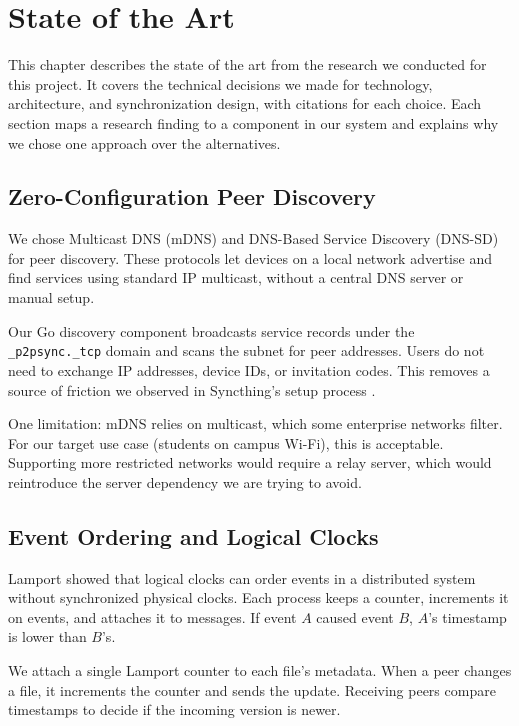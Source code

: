 \chapter{State of the Art}

This chapter describes the state of the art from the research we conducted for this project. It covers the technical decisions we made for technology, architecture, and synchronization design, with citations for each choice. Each section maps a research finding to a component in our system and explains why we chose one approach over the alternatives.

\section{Zero-Configuration Peer Discovery}

We chose Multicast DNS (mDNS) and DNS-Based Service Discovery (DNS-SD) \cite{rfc6762, rfc6763} for peer discovery. These protocols let devices on a local network advertise and find services using standard IP multicast, without a central DNS server or manual setup.

Our Go discovery component broadcasts service records under the \texttt{\_p2psync.\_tcp} domain and scans the subnet for peer addresses. Users do not need to exchange IP addresses, device IDs, or invitation codes. This removes a source of friction we observed in Syncthing's setup process \cite{syncthing}.

One limitation: mDNS relies on multicast, which some enterprise networks filter. For our target use case (students on campus Wi-Fi), this is acceptable. Supporting more restricted networks would require a relay server, which would reintroduce the server dependency we are trying to avoid.

\section{Event Ordering and Logical Clocks}

Lamport \citeyear{lamport1978} showed that logical clocks can order events in a distributed system without synchronized physical clocks. Each process keeps a counter, increments it on events, and attaches it to messages. If event $A$ caused event $B$, $A$'s timestamp is lower than $B$'s.

We attach a single Lamport counter to each file's metadata. When a peer changes a file, it increments the counter and sends the update. Receiving peers compare timestamps to decide if the incoming version is newer.

